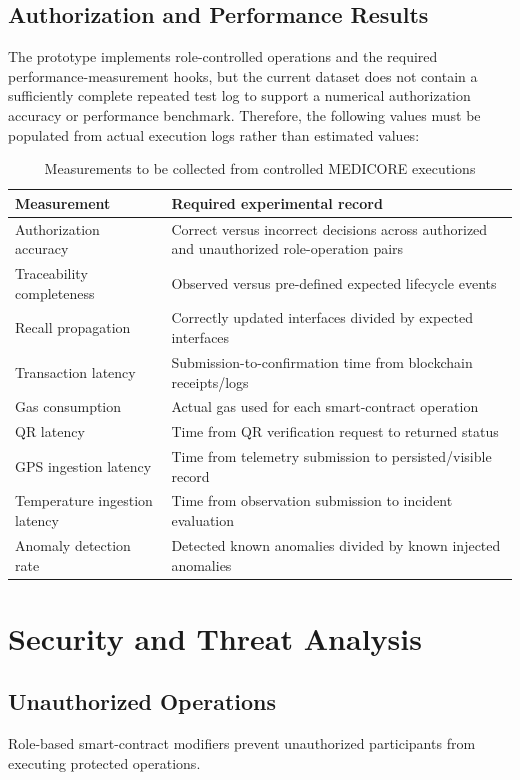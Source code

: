 \documentclass[11pt,a4paper]{article}
\begin{document}
\subsection{Authorization and Performance Results}
The prototype implements role-controlled operations and the required performance-measurement hooks, but the current dataset does not contain a sufficiently complete repeated test log to support a numerical authorization accuracy or performance benchmark. Therefore, the following values must be populated from actual execution logs rather than estimated values:

\begin{table}[htbp]
\centering
\caption{Measurements to be collected from controlled MEDICORE executions}
\label{tab:measurements}
\vspace{0.5em}
\begin{tabularx}{\textwidth}{lX}
\toprule
\textbf{Measurement} & \textbf{Required experimental record} \\
\midrule
Authorization accuracy & Correct versus incorrect decisions across authorized and unauthorized role-operation pairs \\
Traceability completeness & Observed versus pre-defined expected lifecycle events \\
Recall propagation & Correctly updated interfaces divided by expected interfaces \\
Transaction latency & Submission-to-confirmation time from blockchain receipts/logs \\
Gas consumption & Actual gas used for each smart-contract operation \\
QR latency & Time from QR verification request to returned status \\
GPS ingestion latency & Time from telemetry submission to persisted/visible record \\
Temperature ingestion latency & Time from observation submission to incident evaluation \\
Anomaly detection rate & Detected known anomalies divided by known injected anomalies \\
\bottomrule
\end{tabularx}
\end{table}

\section{Security and Threat Analysis}

\subsection{Unauthorized Operations}
Role-based smart-contract modifiers prevent unauthorized participants from executing protected operations.
\end{document}
